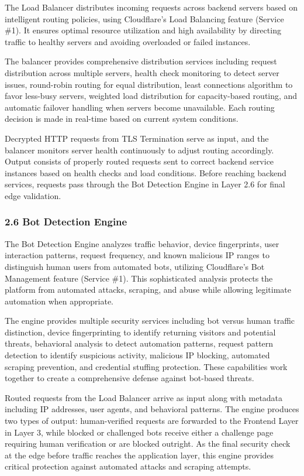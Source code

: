 \documentclass[12pt,a4paper]{report}
\begin{document}
The Load Balancer distributes incoming requests across backend servers based on intelligent routing policies, using Cloudflare's Load Balancing feature (Service \#1). It ensures optimal resource utilization and high availability by directing traffic to healthy servers and avoiding overloaded or failed instances.

The balancer provides comprehensive distribution services including request distribution across multiple servers, health check monitoring to detect server issues, round-robin routing for equal distribution, least connections algorithm to favor less-busy servers, weighted load distribution for capacity-based routing, and automatic failover handling when servers become unavailable. Each routing decision is made in real-time based on current system conditions.

Decrypted HTTP requests from TLS Termination serve as input, and the balancer monitors server health continuously to adjust routing accordingly. Output consists of properly routed requests sent to correct backend service instances based on health checks and load conditions. Before reaching backend services, requests pass through the Bot Detection Engine in Layer 2.6 for final edge validation.

\subsubsection{2.6 Bot Detection Engine}

The Bot Detection Engine analyzes traffic behavior, device fingerprints, user interaction patterns, request frequency, and known malicious IP ranges to distinguish human users from automated bots, utilizing Cloudflare's Bot Management feature (Service \#1). This sophisticated analysis protects the platform from automated attacks, scraping, and abuse while allowing legitimate automation when appropriate.

The engine provides multiple security services including bot versus human traffic distinction, device fingerprinting to identify returning visitors and potential threats, behavioral analysis to detect automation patterns, request pattern detection to identify suspicious activity, malicious IP blocking, automated scraping prevention, and credential stuffing protection. These capabilities work together to create a comprehensive defense against bot-based threats.

Routed requests from the Load Balancer arrive as input along with metadata including IP addresses, user agents, and behavioral patterns. The engine produces two types of output: human-verified requests are forwarded to the Frontend Layer in Layer 3, while blocked or challenged bots receive either a challenge page requiring human verification or are blocked outright. As the final security check at the edge before traffic reaches the application layer, this engine provides critical protection against automated attacks and scraping attempts.
\end{document}
